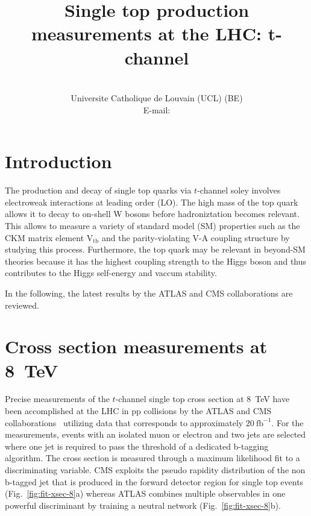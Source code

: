 \documentclass{PoS}
\title{Single top production measurements at the LHC: t-channel}
\author{
    \speaker{Matthias Komm}\\
    Universite Catholique de Louvain (UCL) (BE)\\
    E-mail: \email{Matthias.Komm@cern.ch}
}
\begin{document}
\section{Introduction}
The production and decay of single top quarks via $t$-channel soley involves electroweak interactions at leading order (LO). The high mass of the top quark allows it to decay to on-shell W bosons before hadroniztation becomes relevant. This allows to measure a variety of standard model (SM) properties such as the CKM matrix element $\mathrm{V_{tb}}$ and the parity-violating V-A coupling structure by studying this process. Furthermore, the top quark may be relevant in beyond-SM theories because it has the highest coupling strength to the Higgs boson and thus contributes to the Higgs self-energy and vaccum stability.

In the following, the latest results by the ATLAS and CMS collaborations are reviewed.

\section{Cross section measurements at 8~TeV}
Precise measurements of the $t$-channel single top cross section at 8~TeV have been accomplished at the LHC in pp collisions by the ATLAS and CMS collaborations~\cite{atlas-xsec8,cms-xsec8,CMS-PAS-TOP-15-007} utilizing data that corresponds to approximately $20~\mathrm{fb}^{-1}$. For the measurements, events with an isolated muon or electron and two jets are selected where one jet is required to pass the threshold of a dedicated b-tagging algorithm. The cross section is measured through a maximum likelihood fit to a discriminating variable. CMS exploits the pseudo rapidity distribution of the non b-tagged jet that is produced in the forward detector region for single top events (Fig.~\ref{fig:fit-xsec-8}a) whereas ATLAS combines multiple observables in one powerful discriminant by training a neutral network (Fig.~\ref{fig:fit-xsec-8}b).
\end{document}
